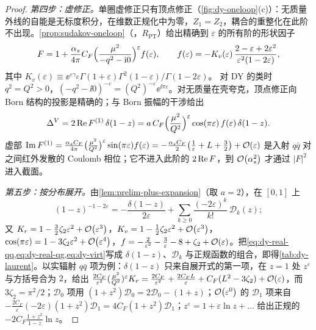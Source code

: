 \begin{proof}
\emph{第四步：虚修正。}单圈虚修正只有顶点修正（\cref{fig:dy-oneloop}(c)）：无质量外线的自能是无标度积分，在维数正规化中为零，$Z_1=Z_2$，耦合的重整化在此阶不出现。\cref{prop:sudakov-oneloop}（\tagR，$R_{\mathrm{PT}}$）给出精确到 $\varepsilon$ 的所有阶的形状因子
\[
F=1+\frac{\alpha_s}{4\pi}C_F\Big(\frac{\mu^2}{-q^2-\mathrm{i}0}\Big)^{\varepsilon}f(\varepsilon),\qquad
f(\varepsilon)=-K_v(\varepsilon)\,\frac{2-\varepsilon+2\varepsilon^2}{\varepsilon^2(1-2\varepsilon)},
\]
其中 $K_v(\varepsilon)\equiv\ee^{\varepsilon\gamma_E}\Gamma(1+\varepsilon)\Gamma^2(1-\varepsilon)/\Gamma(1-2\varepsilon)$。
对 DY 的类时 $q^2=Q^2>0$，$(-q^2-\ii0)^{-\varepsilon}=(Q^2)^{-\varepsilon}\ee^{\ii\pi\varepsilon}$。对无质量在壳夸克，顶点修正向 Born 结构的投影是精确的；与 Born 振幅的干涉给出
\begin{equation}\label{eq:dy-virt}
\Delta^V=2\operatorname{Re} F^{(1)}\,\delta(1-z)=a\,C_F\Big(\frac{\mu^2}{Q^2}\Big)^{\varepsilon}\cos(\pi\varepsilon)\,f(\varepsilon)\,\delta(1-z).
\end{equation}
虚部 $\operatorname{Im} F^{(1)}=\frac{\alpha_s C_F}{4\pi}\big(\frac{\mu^2}{Q^2}\big)^{\varepsilon}\sin(\pi\varepsilon)f(\varepsilon)=-\frac{\alpha_s C_F}{2}\big(\frac1\varepsilon+L+\frac32\big)+\mathcal{O}\!\left(\varepsilon\right)$ 是入射 $q\bar q$ 对之间红外发散的 Coulomb 相位；它不进入此阶的 $2\operatorname{Re} F$，到 $\mathcal{O}\!\left(\alpha_s^2\right)$ 才通过 $|F|^2$ 进入截面。

\emph{第五步：按分布展开。}由\cref{lem:prelim-plus-expansion}（取 $a=2$），在 $[0,1]$ 上
\[
(1-z)^{-1-2\varepsilon}=-\frac{\delta(1-z)}{2\varepsilon}+\sum_{k\ge0}\frac{(-2\varepsilon)^k}{k!}\,\mathcal D_k(z);
\]
又 $K_r=1-\frac32\zeta_2\varepsilon^2+\mathcal{O}\!\left(\varepsilon^3\right)$，$K_v=1-\frac12\zeta_2\varepsilon^2+\mathcal{O}\!\left(\varepsilon^3\right)$，$\cos(\pi\varepsilon)=1-3\zeta_2\varepsilon^2+\mathcal{O}\!\left(\varepsilon^4\right)$，$f=-\frac2{\varepsilon^2}-\frac3\varepsilon-8+\zeta_2+\mathcal{O}\!\left(\varepsilon\right)$。把\cref{eq:dy-real-qq,eq:dy-real-qg,eq:dy-virt}写成 $\delta(1-z)$、$\mathcal D_k$ 与正规函数的组合，即得\cref{tab:dy-laurent}。以实辐射 $q\bar q$ 项为例：$\delta(1-z)$ 只来自展开式的第一项，在 $z=1$ 处 $z^\varepsilon$ 与方括号合为 $2$，给出 $\frac{2C_F}{\varepsilon^2}(\frac{\mu^2}{Q^2})^\varepsilon K_r=\frac{2C_F}{\varepsilon^2}+\frac{2C_FL}{\varepsilon}+C_F(L^2-3\zeta_2)+\mathcal{O}\!\left(\varepsilon\right)$，而 $3\zeta_2=\pi^2/2$；$\mathcal D_0$ 项用 $(1+z^2)\mathcal D_0=2\mathcal D_0-(1+z)$；$\mathcal{O}\!\left(\varepsilon^0\right)$ 的 $\mathcal D_1$ 项来自 $-\frac{2C_F}{\varepsilon}(-2\varepsilon)(1+z^2)\mathcal D_1=4C_F(1+z^2)\mathcal D_1$；$z^\varepsilon=1+\varepsilon\ln z+\dots$ 给出正规的 $-2C_F\frac{1+z^2}{1-z}\ln z$。


\end{proof}
